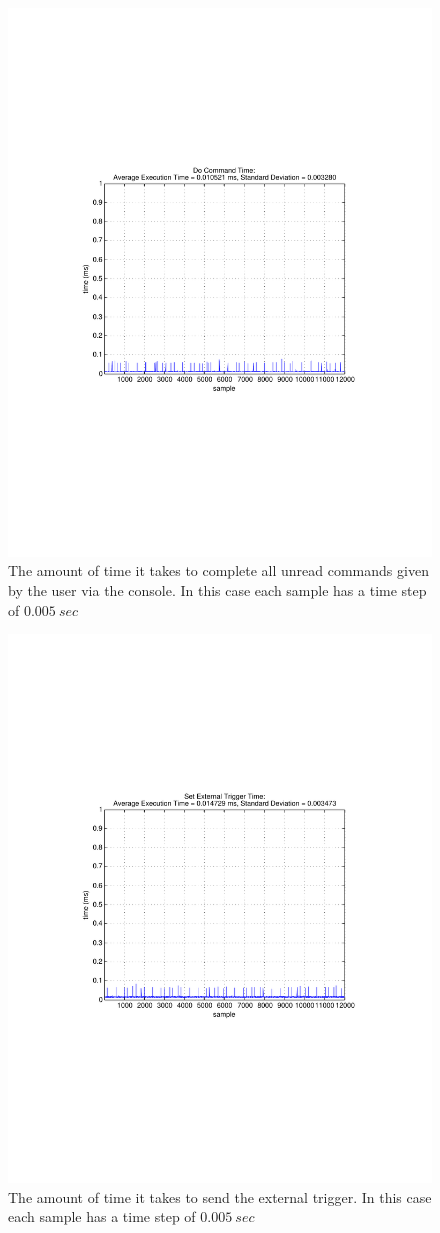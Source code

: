 \begin{figure}[thpb]
  \centering
\includegraphics[width=0.6\columnwidth]{./timingData/doCmd.pdf}
  \caption{The amount of time it takes to complete all unread commands given by the user via the console.  In this case each sample has a time step of $0.005~sec$}
  \label{fig:timing-doCmd}
\end{figure}


\begin{figure}[thpb]
  \centering
\includegraphics[width=0.6\columnwidth]{./timingData/getTrigger.pdf}
  \caption{The amount of time it takes to send the external trigger.  In this case each sample has a time step of $0.005~sec$}
  \label{fig:timing-getTrigger}
\end{figure}

